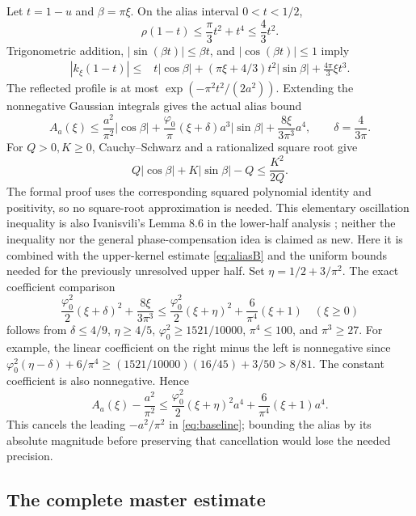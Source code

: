 \documentclass[11pt]{article}
\newcommand{\phz}{\varphi_0}
\begin{document}
Let $t=1-u$ and $\beta=\pi\xi$. On the alias interval $0<t<1/2$,
\[
 \rho(1-t)\le\frac\pi3t^2+t^4\le\frac43t^2.
\]
Trigonometric addition, $|\sin(\beta t)|\le\beta t$, and
$|\cos(\beta t)|\le1$ imply
\begin{align*}
 |k_\xi(1-t)|\le{}&t|\cos\beta|
   +(\pi\xi+4/3)t^2|\sin\beta|+
          \frac{4\pi}3\xi t^3.
\end{align*}
The reflected profile is at most $\exp(-\pi^2t^2/(2a^2))$.
Extending the nonnegative Gaussian integrals gives the actual alias bound
\begin{equation}\label{eq:aliasB}
 A_a(\xi)\le\frac{a^2}{\pi^2}|\cos\beta|
  +\frac{\phz}{\pi}(\xi+\delta)a^3|\sin\beta|
  +\frac{8\xi}{3\pi^3}a^4,
 \qquad\delta=\frac4{3\pi}.
\end{equation}
For $Q>0,K\ge0$, Cauchy--Schwarz and a rationalized square root give
\[
 Q|\cos\beta|+K|\sin\beta|-Q\le\frac{K^2}{2Q}.
\]
The formal proof uses the corresponding squared polynomial identity and
positivity, so no square-root approximation is needed.
This elementary oscillation inequality is also Ivanisvili's Lemma 8.6 in
the lower-half analysis \cite{I}; neither the inequality nor the general
phase-compensation idea is claimed as new. Here it is combined with the
upper-kernel estimate \eqref{eq:aliasB} and the uniform bounds needed for
the previously unresolved upper half.
Set $\eta=1/2+3/\pi^2$. The exact coefficient comparison
\[
 \frac{\phz^2}2(\xi+\delta)^2+\frac{8\xi}{3\pi^3}
 \le\frac{\phz^2}2(\xi+\eta)^2+\frac6{\pi^4}(\xi+1)
 \quad(\xi\ge0)
\]
follows from $\delta\le4/9$, $\eta\ge4/5$,
$\phz^2\ge1521/10000$, $\pi^4\le100$, and $\pi^3\ge27$.
For example, the linear coefficient on the right minus the left is
nonnegative since
$\phz^2(\eta-\delta)+6/\pi^4\ge(1521/10000)(16/45)+3/50>8/81$.
The constant coefficient is also nonnegative. Hence
\begin{equation}\label{eq:compalias}
 A_a(\xi)-\frac{a^2}{\pi^2}
 \le\frac{\phz^2}2(\xi+\eta)^2a^4+\frac6{\pi^4}(\xi+1)a^4.
\end{equation}
This cancels the leading $-a^2/\pi^2$ in \eqref{eq:baseline}; bounding the
alias by its absolute magnitude before preserving that cancellation would
lose the needed precision.

\subsection{The complete master estimate}
\end{document}
